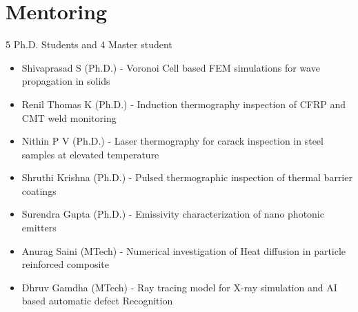 \documentclass{my_cv}%
\begin{document}
\section{Mentoring}
\vspace{1em}
\noindent \faEye \hspace{1em} \color{mygray} 5 Ph.D. Students and 4 Master student 
\begin{itemize}[leftmargin=0.15in]
\setlength\itemsep{-0.1em}
\color{mygray}
\item Shivaprasad S (Ph.D.) - Voronoi Cell based FEM simulations for wave propagation in solids \cite{Shivaprasadcomsolconf2015,Shivaprasadconf2015}
\item Renil Thomas K (Ph.D.) - Induction thermography inspection of CFRP and CMT weld monitoring \cite{Renilconf2016,Kidanganconf2016,thomas2017,Renil2022} 
\item Nithin P V (Ph.D.) - Laser thermography for carack inspection in steel samples at elevated temperature \cite{Nithin2019,Nithinconf2016,Nithinconf2018,puthiyaveettil2020}
\item Shruthi Krishna (Ph.D.) - Pulsed thermographic inspection of thermal barrier coatings \cite{Sruthiconf2018,Krishnaconf2017}
\item Surendra Gupta (Ph.D.) - Emissivity characterization of nano photonic emitters \cite{Surendraconf2020,Surendra2021}
\item Anurag Saini (MTech) - Numerical investigation of Heat diffusion in particle reinforced composite \cite{Saini2020}
\item Dhruv Gamdha (MTech) - Ray tracing model for X-ray simulation and AI based automatic defect Recognition \cite{Dhruv2019,Dhruv2021}
\end{itemize}
\end{document}
